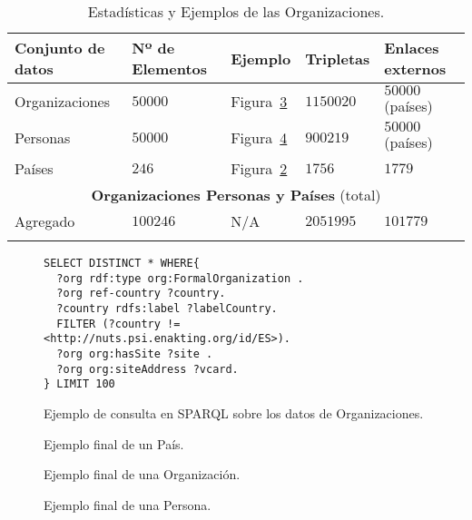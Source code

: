\begin{longtable}[c]{|p{4cm}|p{3.5cm}|p{2cm}|p{2cm}|p{2.5cm}|} 
\hline
  \textbf{Conjunto de datos} & \textbf{Nº de Elementos}  &  \textbf{Ejemplo} &  \textbf{Tripletas} &  \textbf{Enlaces externos}  \\\hline
\endhead
Organizaciones & $50000$  & Figura~\ref{fig:orgs-example}   & $1150020$  & $50000$ (países)   \\ \hline
Personas & $50000$ &  Figura~\ref{fig:people-example}   & $900219$  & $50000$  (países)  \\ \hline
Países & $246$& Figura~\ref{fig:countries-example}      & $1756$  & $1779$ \\ \hline
\multicolumn{5}{|c|}{\textbf{Organizaciones Personas y Países} (total)} \\ \hline
Agregado & $100246$ &  N/A & $2051995$ & $101779$   \\ \hline
\hline
\caption{Estadísticas y Ejemplos de las Organizaciones.}\label{table:orgs-ejemplos}\\    
\end{longtable}

\begin{figure}[!htp]
\begin{lstlisting} 
SELECT DISTINCT * WHERE{
  ?org rdf:type org:FormalOrganization .
  ?org ref-country ?country.
  ?country rdfs:label ?labelCountry.
  FILTER (?country != <http://nuts.psi.enakting.org/id/ES>).  
  ?org org:hasSite ?site .
  ?org org:siteAddress ?vcard.
} LIMIT 100
\end{lstlisting}
	\caption{Ejemplo de consulta en SPARQL sobre los datos de Organizaciones.}
	\label{fig:orgs-sparql-query}
\end{figure}

\begin{figure}[!htp]

	\caption{Ejemplo final de un País.}
	\label{fig:countries-example}
\end{figure}


\begin{figure}[!htp]

	\caption{Ejemplo final de una Organización.}
	\label{fig:orgs-example}
\end{figure}

\begin{figure}[!htp]
	
	\caption{Ejemplo final de una Persona.}
	\label{fig:people-example}
\end{figure}

